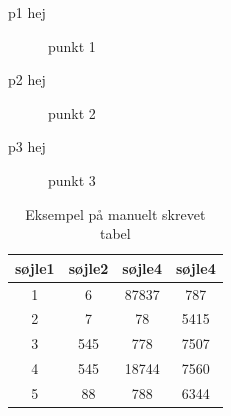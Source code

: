 \documentclass{article}
\begin{document}
     \begin{description}
       \item[p1 hej] punkt 1
       \item[p2 hej] punkt 2
       \item[p3 hej] punkt 3 
     \end{description}


     \begin{table}[h]
       \centering
       \begin{tabular}{||c c | c c||}
         \hline
         søjle1 & søjle2 & søjle4 & søjle4 \\  \hline
         1      & 6      & 87837  & 787    \\
         2      & 7      & 78     & 5415   \\
         3      & 545    & 778    & 7507   \\
         4      & 545    & 18744  & 7560   \\
         5      & 88     & 788    & 6344   \\
         \hline
       \end{tabular}
       \caption{Eksempel på manuelt skrevet tabel}\label{table:data}
     \end{table}

     \newpage
     \appendix
     {}
     
\end{document}
